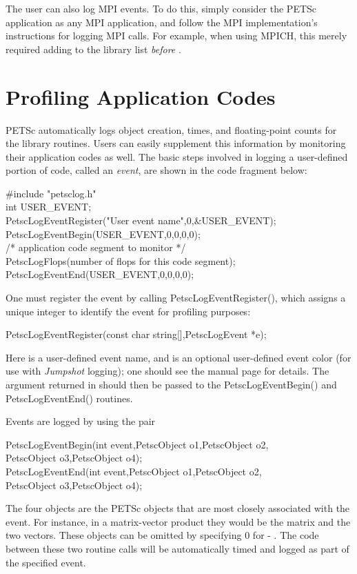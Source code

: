 {{The user can also log MPI events.  To do this, simply consider the
PETSc application as any MPI application, and follow the MPI
implementation's instructions for logging MPI calls. For example, when
using MPICH, this merely required adding  to the library
list {\em before} .

\section{Profiling Application Codes}
\label{sec_profileuser}

PETSc automatically logs object creation, times, and floating-point
counts for the library routines. Users can easily supplement
this information by monitoring their application codes as well.
The basic steps involved in logging a
user-defined portion of code, called an {\em event}, are shown in the
code fragment below:
\begin{tabbing}
    \#include "petsclog.h"\\
    int USER\_EVENT;\\
    PetscLogEventRegister("User event name",0,\&USER\_EVENT);\\
    PetscLogEventBegin(USER\_EVENT,0,0,0,0);\\
       /* application code segment to monitor */\\
       PetscLogFlops(number of flops for this code segment);\\
    PetscLogEventEnd(USER\_EVENT,0,0,0,0);
\end{tabbing}

One must register the event by calling PetscLogEventRegister(), which assigns a unique integer to identify the
event for profiling purposes:
\begin{tabbing}
  PetscLogEventRegister(const char string[],PetscLogEvent *e);
\end{tabbing}
Here  is a user-defined event name, and  is an
optional user-defined event color (for use with {\em Jumpshot} logging);
one should see the manual page for details.  The argument returned in  should then
be passed to the PetscLogEventBegin() and PetscLogEventEnd()
routines.

Events are logged by using the pair
\begin{tabbing}
   PetscLogEventBegin(int event,PetscObject o1,PetscObject o2,\\
                      PetscObject o3,PetscObject o4);\\
   PetscLogEventEnd(int event,PetscObject o1,PetscObject o2,\\
                    PetscObject o3,PetscObject o4);
\end{tabbing}
The
four objects are the PETSc objects that are most closely associated
with the event.  For instance, in a matrix-vector product they
would be the matrix and the two vectors.  These objects can be omitted
by specifying 0 for  - .  The code between these
two routine calls will be automatically timed and logged as part of the
specified event.

}}
